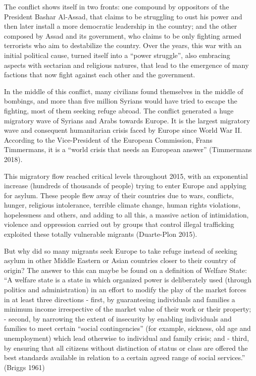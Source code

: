 \documentclass[]{elsarticle} %
\begin{document}
The conflict shows itself in two fronts: one compound by oppositors of
the President Bashar Al-Assad, that claims to be struggling to oust his
power and then later install a more democratic leadership in the
country; and the other composed by Assad and its government, who claims
to be only fighting armed terrorists who aim to destabilize the country.
Over the years, this war with an initial political cause, turned itself
into a ``power struggle'', also embracing aspects with sectarian and
religious natures, that lead to the emergence of many factions that now
fight against each other and the government.

In the middle of this conflict, many civilians found themselves in the
middle of bombings, and more than five million Syrians would have tried
to escape the fighting, most of them seeking refuge abroad. The conflict
generated a huge migratory wave of Syrians and Arabs towards Europe. It
is the largest migratory wave and consequent humanitarian crisis faced
by Europe since World War II. According to the Vice-President of the
European Commission, Frans Timmermans, it is a ``world crisis that needs
an European answer'' (Timmermans 2018).

This migratory flow reached critical levels throughout 2015, with an
exponential increase (hundreds of thousands of people) trying to enter
Europe and applying for asylum. These people flew away of their
countries due to wars, conflicts, hunger, religious intolerance,
terrible climate change, human rights violations, hopelessness and
others, and adding to all this, a massive action of intimidation,
violence and oppression carried out by groups that control illegal
trafficking exploited these totally vulnerable migrants (Duarte-Plon
2015).

But why did so many migrants seek Europe to take refuge instead of
seeking asylum in other Middle Eastern or Asian countries closer to
their country of origin? The answer to this can maybe be found on a
definition of Welfare State: ``A welfare state is a state in which
organized power is deliberately used (through politics and
administration) in an effort to modify the play of the market forces in
at least three directions - first, by guaranteeing individuals and
families a minimum income irrespective of the market value of their work
or their property; - second, by narrowing the extent of insecurity by
enabling individuals and families to meet certain ``social
contingencies'' (for example, sickness, old age and unemployment) which
lead otherwise to individual and family crisis; and - third, by ensuring
that all citizens without distinction of status or class are offered the
best standards available in relation to a certain agreed range of social
services.'' (Briggs 1961)
\end{document}
